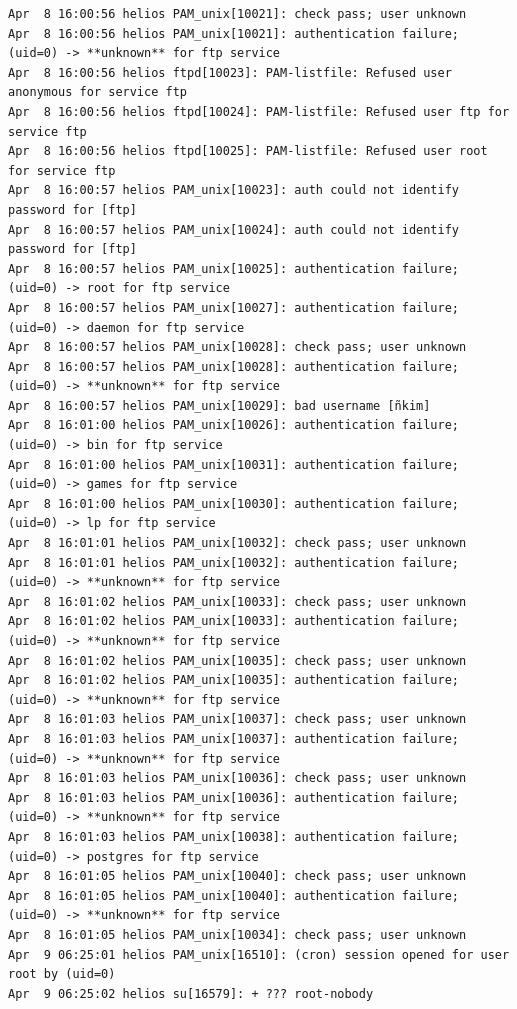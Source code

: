 \begin{lstlisting}[style=terminal]
Apr  8 16:00:56 helios PAM_unix[10021]: check pass; user unknown
Apr  8 16:00:56 helios PAM_unix[10021]: authentication failure; (uid=0) -> **unknown** for ftp service
Apr  8 16:00:56 helios ftpd[10023]: PAM-listfile: Refused user anonymous for service ftp
Apr  8 16:00:56 helios ftpd[10024]: PAM-listfile: Refused user ftp for service ftp
Apr  8 16:00:56 helios ftpd[10025]: PAM-listfile: Refused user root for service ftp
Apr  8 16:00:57 helios PAM_unix[10023]: auth could not identify password for [ftp]
Apr  8 16:00:57 helios PAM_unix[10024]: auth could not identify password for [ftp]
Apr  8 16:00:57 helios PAM_unix[10025]: authentication failure; (uid=0) -> root for ftp service
Apr  8 16:00:57 helios PAM_unix[10027]: authentication failure; (uid=0) -> daemon for ftp service
Apr  8 16:00:57 helios PAM_unix[10028]: check pass; user unknown
Apr  8 16:00:57 helios PAM_unix[10028]: authentication failure; (uid=0) -> **unknown** for ftp service
Apr  8 16:00:57 helios PAM_unix[10029]: bad username [ñkim]
Apr  8 16:01:00 helios PAM_unix[10026]: authentication failure; (uid=0) -> bin for ftp service
Apr  8 16:01:00 helios PAM_unix[10031]: authentication failure; (uid=0) -> games for ftp service
Apr  8 16:01:00 helios PAM_unix[10030]: authentication failure; (uid=0) -> lp for ftp service
Apr  8 16:01:01 helios PAM_unix[10032]: check pass; user unknown
Apr  8 16:01:01 helios PAM_unix[10032]: authentication failure; (uid=0) -> **unknown** for ftp service
Apr  8 16:01:02 helios PAM_unix[10033]: check pass; user unknown
Apr  8 16:01:02 helios PAM_unix[10033]: authentication failure; (uid=0) -> **unknown** for ftp service
Apr  8 16:01:02 helios PAM_unix[10035]: check pass; user unknown
Apr  8 16:01:02 helios PAM_unix[10035]: authentication failure; (uid=0) -> **unknown** for ftp service
Apr  8 16:01:03 helios PAM_unix[10037]: check pass; user unknown
Apr  8 16:01:03 helios PAM_unix[10037]: authentication failure; (uid=0) -> **unknown** for ftp service
Apr  8 16:01:03 helios PAM_unix[10036]: check pass; user unknown
Apr  8 16:01:03 helios PAM_unix[10036]: authentication failure; (uid=0) -> **unknown** for ftp service
Apr  8 16:01:03 helios PAM_unix[10038]: authentication failure; (uid=0) -> postgres for ftp service
Apr  8 16:01:05 helios PAM_unix[10040]: check pass; user unknown
Apr  8 16:01:05 helios PAM_unix[10040]: authentication failure; (uid=0) -> **unknown** for ftp service
Apr  8 16:01:05 helios PAM_unix[10034]: check pass; user unknown
Apr  9 06:25:01 helios PAM_unix[16510]: (cron) session opened for user root by (uid=0)
Apr  9 06:25:02 helios su[16579]: + ??? root-nobody

\end{lstlisting}
